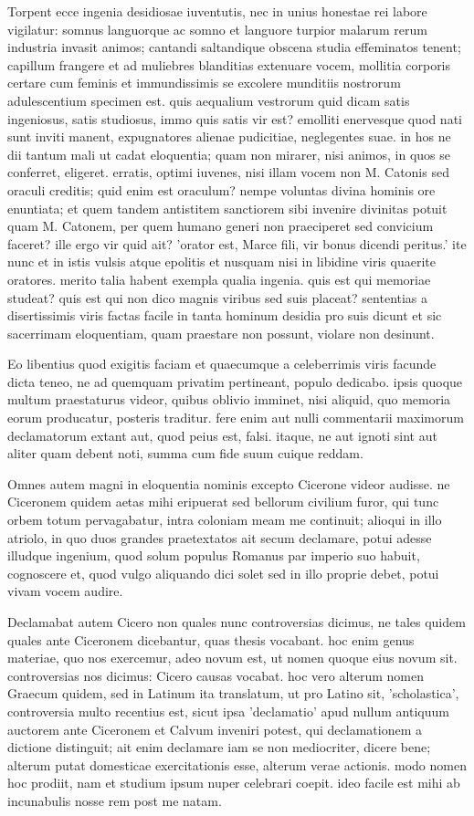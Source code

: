 Torpent ecce ingenia desidiosae iuventutis, nec in unius honestae rei labore vigilatur: somnus languorque ac somno et languore turpior malarum rerum industria invasit animos; cantandi saltandique obscena studia effeminatos tenent; capillum frangere et ad muliebres blanditias extenuare vocem, mollitia corporis certare cum feminis et immundissimis se excolere munditiis nostrorum adulescentium specimen est. quis aequalium vestrorum quid dicam satis ingeniosus, satis studiosus, immo quis satis vir est? emolliti enervesque quod nati sunt inviti manent, expugnatores alienae pudicitiae, neglegentes suae. in hos ne dii tantum mali ut cadat eloquentia; quam non mirarer, nisi animos, in quos se conferret, eligeret. erratis, optimi iuvenes, nisi illam vocem non M. Catonis sed oraculi creditis; quid enim est oraculum? nempe voluntas divina hominis ore enuntiata; et quem tandem antistitem sanctiorem sibi invenire divinitas potuit quam M. Catonem, per quem humano generi non praeciperet sed convicium faceret? ille ergo vir quid ait? 'orator est, Marce fili, vir bonus dicendi peritus.' ite nunc et in istis vulsis atque epolitis et nusquam nisi in libidine viris quaerite oratores. merito talia habent exempla qualia ingenia. quis est qui memoriae studeat? quis est qui non dico magnis viribus sed suis placeat? sententias a disertissimis viris factas facile in tanta hominum desidia pro suis dicunt et sic sacerrimam eloquentiam, quam praestare non possunt, violare non desinunt.

Eo libentius quod exigitis faciam et quaecumque a celeberrimis viris facunde dicta teneo, ne ad quemquam privatim pertineant, populo dedicabo. ipsis quoque multum praestaturus videor, quibus oblivio imminet, nisi aliquid, quo memoria eorum producatur, posteris traditur. fere enim aut nulli commentarii maximorum declamatorum extant aut, quod peius est, falsi. itaque, ne aut ignoti sint aut aliter quam debent noti, summa cum fide suum cuique reddam.

Omnes autem magni in eloquentia nominis excepto Cicerone videor audisse. ne Ciceronem quidem aetas mihi eripuerat sed bellorum civilium furor, qui tunc orbem totum pervagabatur, intra coloniam meam me continuit; alioqui in illo atriolo, in quo duos grandes praetextatos ait secum declamare, potui adesse illudque ingenium, quod solum populus Romanus par imperio suo habuit, cognoscere et, quod vulgo aliquando dici solet sed in illo proprie debet, potui vivam vocem audire.

Declamabat autem Cicero non quales nunc controversias dicimus, ne tales quidem quales ante Ciceronem dicebantur, quas thesis vocabant. hoc enim genus materiae, quo nos exercemur, adeo novum est, ut nomen quoque eius novum sit. controversias nos dicimus: Cicero causas vocabat. hoc vero alterum nomen Graecum quidem, sed in Latinum ita translatum, ut pro Latino sit, 'scholastica', controversia multo recentius est, sicut ipsa 'declamatio' apud nullum antiquum auctorem ante Ciceronem et Calvum inveniri potest, qui declamationem a dictione distinguit; ait enim declamare iam se non mediocriter, dicere bene; alterum putat domesticae exercitationis esse, alterum verae actionis. modo nomen hoc prodiit, nam et studium ipsum nuper celebrari coepit. ideo facile est mihi ab incunabulis nosse rem post me natam.

